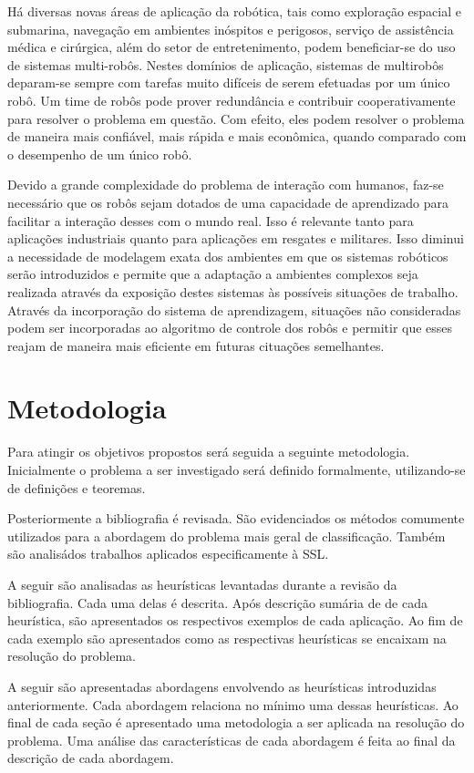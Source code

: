 Há diversas novas áreas de aplicação da robótica, tais como exploração espacial e submarina,
navegação em ambientes inóspitos e perigosos, serviço de assistência médica
e cirúrgica, além do setor de entretenimento, podem beneficiar-se do uso de sistemas
multi-robôs. Nestes domínios de aplicação, sistemas de multirobôs deparam-se sempre
com tarefas muito difíceis de serem efetuadas por um único robô. Um time de robôs pode
prover redundância e contribuir cooperativamente para resolver o problema em questão.
Com efeito, eles podem resolver o problema de maneira mais confiável, mais rápida e
mais econômica, quando comparado com o desempenho de um único robô.

Devido a grande complexidade do problema de interação com humanos, faz-se necessário
que os robôs sejam dotados de uma capacidade de aprendizado para facilitar a interação
desses com o mundo real. Isso é relevante tanto para aplicações industriais quanto para
aplicações em resgates e militares. Isso diminui a necessidade de modelagem
exata dos ambientes em que os sistemas robóticos serão introduzidos e permite que
a adaptação a ambientes complexos seja realizada através da exposição destes sistemas
às possíveis situações de trabalho. Através da incorporação do sistema de
aprendizagem, situações não consideradas podem ser incorporadas ao algoritmo de
controle dos robôs e permitir que esses reajam de maneira mais eficiente em futuras
cituações semelhantes.

\section{Metodologia}

Para atingir os objetivos propostos será seguida a seguinte metodologia.
Inicialmente o problema a ser investigado será definido formalmente,
utilizando-se de definições e teoremas.

Posteriormente a bibliografia é revisada. São evidenciados os métodos comumente
utilizados para a abordagem do problema mais geral de classificação. Também são
analisádos trabalhos aplicados especificamente à SSL.

A seguir são analisadas as heurísticas levantadas durante a
revisão da bibliografia. Cada uma delas é descrita. Após descrição sumária de
de cada heurística, são apresentados os respectivos exemplos de cada aplicação.
Ao fim de cada exemplo são apresentados como as respectivas heurísticas se encaixam na
resolução do problema.

A seguir são apresentadas abordagens envolvendo as heurísticas introduzidas
anteriormente. Cada abordagem relaciona no mínimo uma dessas heurísticas.
Ao final de cada seção é apresentado uma metodologia a ser aplicada
na resolução do problema. Uma análise das características de cada abordagem
é feita ao final da descrição de cada abordagem.

